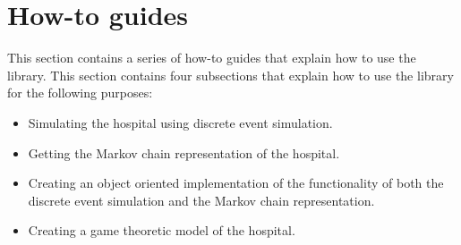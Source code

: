 \section{How-to guides}\label{sec:ambulance_game_how_to}

This section contains a series of how-to guides that explain how to use the
library.
This section contains four subsections that explain how to use the library
for the following purposes:

\begin{itemize}
    \item Simulating the hospital using discrete event simulation.
    \item Getting the Markov chain representation of the hospital.
    \item Creating an object oriented implementation of the functionality of
    both the discrete event simulation and the Markov chain representation.
    \item Creating a game theoretic model of the hospital. 
\end{itemize}







